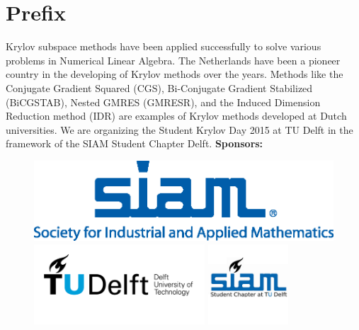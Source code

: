 \documentclass{article}
\begin{document}
\section*{Prefix}
Krylov subspace methods have been applied successfully to solve various problems 
in Numerical Linear Algebra. The Netherlands have been a pioneer country in the developing of Krylov methods over the years.
Methods like the Conjugate Gradient Squared (CGS), Bi-Conjugate Gradient Stabilized (BiCGSTAB), Nested GMRES (GMRESR), and the Induced Dimension Reduction method (IDR) are examples of Krylov methods developed at Dutch universities. 
We are organizing the Student Krylov Day 2015 at TU Delft in the framework of the SIAM Student Chapter Delft. 
\newpage
\thispagestyle{empty}
\null
\vspace{11cm}
\textbf{Sponsors:}
\vspace{1cm}
\begin{figure}[h]
 \includegraphics[height=3cm]{Society_for_Industrial_and_Applied_Mathematics_(logo).png} \hfill
  \includegraphics[height=3cm]{TU_d_line_P1_color-TU-Delft.png} \hfill
   \includegraphics[height=3cm]{SIAMSC_Delft.png}
\end{figure}

\newpage
\end{document}
